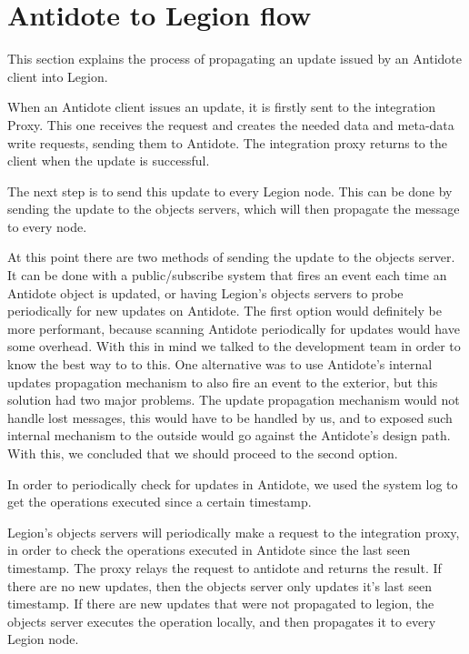 \section{Antidote to Legion flow}
\label{sec:antidote_to_legion_flow}
This section explains the process of propagating an update issued by an Antidote client into Legion.\par
	When an Antidote client issues an update, it is firstly sent to the integration Proxy. This one receives the request and creates the needed data and meta-data write requests, sending them to Antidote. The integration proxy returns to the client when the update is successful.\par
	The next step is to send this update to every Legion node. This can be done by sending the update to the objects servers, which will then propagate the message to every node.\par
	At this point there are two methods of sending the update to the objects server. It can be done with a public/subscribe system that fires an event each time an Antidote object is updated, or having Legion's objects servers to probe periodically for new updates on Antidote. The first option would definitely be more performant, because scanning Antidote periodically for updates would have some overhead. With this in mind we talked to the development team in order to know the best way to to this. One alternative was to use Antidote's internal updates propagation mechanism to also fire an event to the exterior, but this solution had two major problems. The update propagation mechanism would not handle lost messages, this would have to be handled by us, and to exposed such internal mechanism to the outside would go against the Antidote's design path. With this, we concluded that we should proceed to the second option.\par
	In order to periodically check for updates in Antidote, we used the system log to get the operations executed since a certain timestamp.\par
	Legion's objects servers will periodically make a request to the integration proxy, in order to check the operations executed in Antidote since the last seen timestamp. The proxy relays the request to antidote and returns the result. If there are no new updates, then the objects server only updates it's last seen timestamp. If there are new updates that were not propagated to legion, the objects server executes the operation locally, and then propagates it to every Legion node.